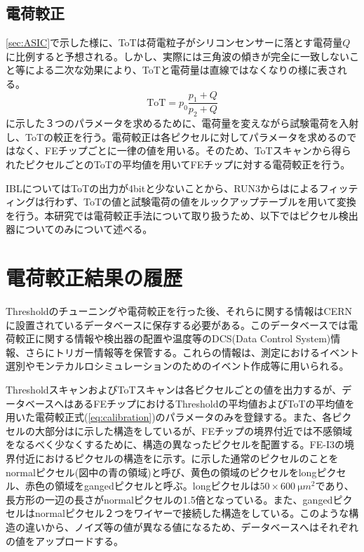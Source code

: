 \subsection{電荷較正}
\label{sec:calibration}
\ref{sec:ASIC}で示した様に、ToTは荷電粒子がシリコンセンサーに落とす電荷量$Q$に比例すると予想される。しかし、実際には三角波の傾きが完全に一致しないこと等による二次な効果により、ToTと電荷量は直線ではなくなりの様に表される。
\begin{equation}
  \label{eq:calibration}
  \mathrm{ToT} = p_0\frac{p_1 + Q}{p_2 + Q}
\end{equation}
に示した３つのパラメータを求めるために、電荷量を変えながら試験電荷を入射し、ToTの較正を行う。電荷較正は各ピクセルに対してパラメータを求めるのではなく、FEチップごとに一律の値を用いる。そのため、ToTスキャンから得られたピクセルごとのToTの平均値を用いてFEチップに対する電荷較正を行う。

IBLについてはToTの出力が4bitと少ないことから、RUN3からはによるフィッティングは行わず、ToTの値と試験電荷の値をルックアップテーブルを用いて変換を行う。本研究では電荷較正手法について取り扱うため、以下ではピクセル検出器についてのみについて述べる。

\section{電荷較正結果の履歴}
\label{sec:probrem}
Thresholdのチューニングや電荷較正を行った後、それらに関する情報はCERNに設置されているデータベース\cite{pixeldb}に保存する必要がある。このデータベースでは電荷較正に関する情報や検出器の配置や温度等のDCS(Data Control System)情報、さらにトリガー情報等を保管する。これらの情報は、測定におけるイベント選別やモンテカルロシミュレーションのためのイベント作成等に用いられる。

ThresholdスキャンおよびToTスキャンは各ピクセルごとの値を出力するが、データベースへはあるFEチップにおけるThresholdの平均値およびToTの平均値を用いた電荷較正式(\ref{eq:calibration})のパラメータのみを登録する。また、各ピクセルの大部分はに示した構造をしているが、FEチップの境界付近では不感領域をなるべく少なくするために、構造の異なったピクセルを配置する。FE-I3の境界付近におけるピクセルの構造をに示す。に示した通常のピクセルのことをnormalピクセル(図中の青の領域)と呼び、黄色の領域のピクセルをlongピクセル、赤色の領域をgangedピクセルと呼ぶ。longピクセルは$50\times 600\ \si{\micro m^2}$であり、長方形の一辺の長さがnormalピクセルの1.5倍となっている。また、gangedピクセルはnormalピクセル２つをワイヤーで接続した構造をしている。このような構造の違いから、ノイズ等の値が異なる値になるため、データベースへはそれぞれの値をアップロードする。

